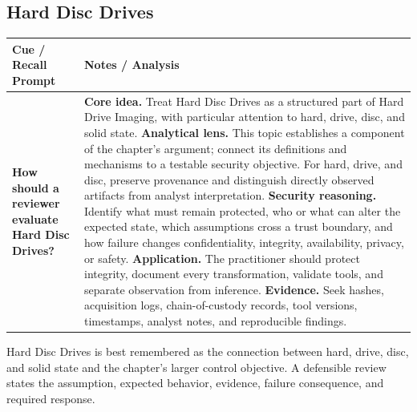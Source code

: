 \documentclass[11pt]{article}
\newcommand{\CornellHeader}{%
\rowcolor{Navy}\color{white}\bfseries Cue / Recall Prompt & \color{white}\bfseries Notes / Analysis\\\hline}
\newcommand{\CornellRow}[2]{%
\cellcolor{CueGray}\RaggedRight\textbf{#1} & \RaggedRight #2\\\hline}
\begin{document}
\subsection*{Hard Disc Drives}
\begin{longtable}{>{\RaggedRight\arraybackslash}p{}|>{\RaggedRight\arraybackslash}p{}}
\CornellHeader
\CornellRow{How should a reviewer evaluate Hard Disc Drives?}{\textbf{Core idea.} Treat Hard Disc Drives as a structured part of Hard Drive Imaging, with particular attention to hard, drive, disc, and solid state. \textbf{Analytical lens.} This topic establishes a component of the chapter's argument; connect its definitions and mechanisms to a testable security objective. For hard, drive, and disc, preserve provenance and distinguish directly observed artifacts from analyst interpretation. \textbf{Security reasoning.} Identify what must remain protected, who or what can alter the expected state, which assumptions cross a trust boundary, and how failure changes confidentiality, integrity, availability, privacy, or safety. \textbf{Application.} The practitioner should protect integrity, document every transformation, validate tools, and separate observation from inference. \textbf{Evidence.} Seek hashes, acquisition logs, chain-of-custody records, tool versions, timestamps, analyst notes, and reproducible findings.}
\end{longtable}
\begin{topicsummary}
Hard Disc Drives is best remembered as the connection between hard, drive, disc, and solid state and the chapter's larger control objective. A defensible review states the assumption, expected behavior, evidence, failure consequence, and required response.
\end{topicsummary}
\end{document}
